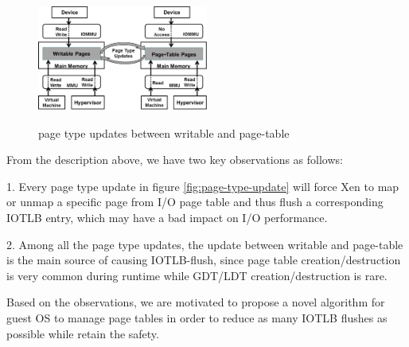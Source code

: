 \begin{figure}[ht]
\centering
\includegraphics[width=0.5\textwidth]{image/background/wr2pt.png} \\
\caption{page type updates between writable and page-table}
\label{fig:wr2pt}
\end{figure}

From the description above, we have two key observations as follows:

1. Every page type update in figure \ref{fig:page-type-update} will force Xen to map or unmap a specific page from I/O page table and thus flush a corresponding IOTLB entry, which may have a bad impact on I/O performance.

2. Among all the page type updates, the update between writable and page-table is the main source of causing IOTLB-flush, since page table creation/destruction is very common during runtime while GDT/LDT creation/destruction is rare.

Based on the observations, we are motivated to propose a novel algorithm for guest OS to manage page tables in order to reduce as many IOTLB flushes as possible while retain the safety.
